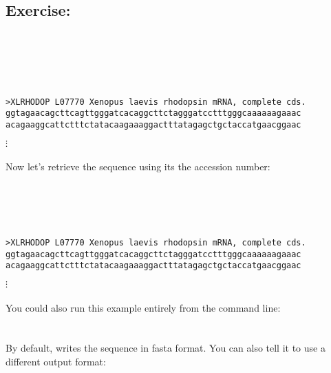 \documentclass[12pt]{report}
\begin{document}
\subsection*{Exercise: }

\unix{}\\
\\
\\
\\

\unix{}
\begin{verbatim}
>XLRHODOP L07770 Xenopus laevis rhodopsin mRNA, complete cds.
ggtagaacagcttcagttgggatcacaggcttctagggatcctttgggcaaaaaagaaac
acagaaggcattctttctatacaagaaaggactttatagagctgctaccatgaacggaac
\end{verbatim}
$\vdots$
\\
\\
\noindent Now let's retrieve the sequence using its the accession 
number:\\

\unix{}\\
\\
\\
\\

\unix{}
\begin{verbatim}
>XLRHODOP L07770 Xenopus laevis rhodopsin mRNA, complete cds.
ggtagaacagcttcagttgggatcacaggcttctagggatcctttgggcaaaaaagaaac
acagaaggcattctttctatacaagaaaggactttatagagctgctaccatgaacggaac
\end{verbatim}
$\vdots$
\\
\\
\noindent You could also run this example entirely from the command line:\\

\unix{}
\\
\\
By default,  writes the sequence in fasta
format. You can also tell it to use a different output format:\\

\unix{}\\
\end{document}

